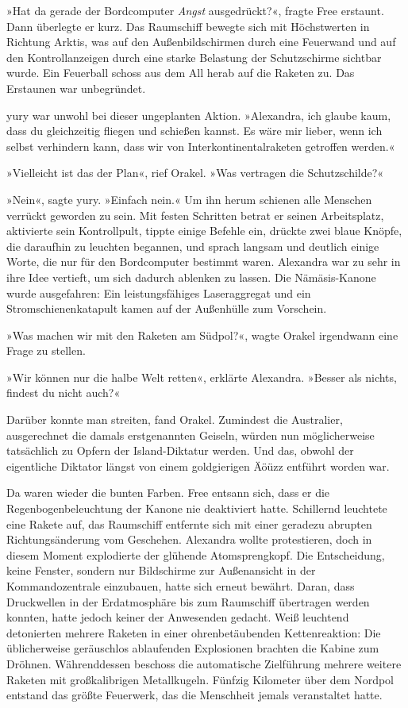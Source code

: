 »Hat da gerade der Bordcomputer \emph{Angst} ausgedrückt?«, fragte Free erstaunt. Dann überlegte er kurz. Das Raumschiff bewegte sich mit Höchstwerten in Richtung Arktis, was auf den Außenbildschirmen durch eine Feuerwand und auf den Kontrollanzeigen durch eine starke Belastung der Schutzschirme sichtbar wurde. Ein Feuerball schoss aus dem All herab auf die Raketen zu. Das Erstaunen war unbegründet.

yury war unwohl bei dieser ungeplanten Aktion. »Alexandra, ich glaube kaum, dass du gleichzeitig fliegen und schießen kannst. Es wäre mir lieber, wenn ich selbst verhindern kann, dass wir von Interkontinentalraketen getroffen werden.«

»Vielleicht ist das der Plan«, rief Orakel. »Was vertragen die Schutzschilde?«

»Nein«, sagte yury. »Einfach nein.« Um ihn herum schienen alle Menschen verrückt geworden zu sein. Mit festen Schritten betrat er seinen Arbeitsplatz, aktivierte sein Kontrollpult, tippte einige Befehle ein, drückte zwei blaue Knöpfe, die daraufhin zu leuchten begannen, und sprach langsam und deutlich einige Worte, die nur für den Bordcomputer bestimmt waren. Alexandra war zu sehr in ihre Idee vertieft, um sich dadurch ablenken zu lassen. Die Nämäsis-Kanone wurde ausgefahren: Ein leistungsfähiges Laseraggregat und ein Stromschienenkatapult kamen auf der Außenhülle zum Vorschein.

»Was machen wir mit den Raketen am Südpol?«, wagte Orakel irgendwann eine Frage zu stellen.

»Wir können nur die halbe Welt retten«, erklärte Alexandra. »Besser als nichts, findest du nicht auch?«

Darüber konnte man streiten, fand Orakel. Zumindest die Australier, ausgerechnet die damals erstgenannten Geiseln, würden nun möglicherweise tatsächlich zu Opfern der Island-Diktatur werden. Und das, obwohl der eigentliche Diktator längst von einem goldgierigen Äöüzz entführt worden war.

Da waren wieder die bunten Farben. Free entsann sich, dass er die Regenbogenbeleuchtung der Kanone nie deaktiviert hatte. Schillernd leuchtete eine Rakete auf, das Raumschiff entfernte sich mit einer geradezu abrupten Richtungsänderung vom Geschehen. Alexandra wollte protestieren, doch in diesem Moment explodierte der glühende Atomsprengkopf. Die Entscheidung, keine Fenster, sondern nur Bildschirme zur Außenansicht in der Kommandozentrale einzubauen, hatte sich erneut bewährt. Daran, dass Druckwellen in der Erdatmosphäre bis zum Raumschiff übertragen werden konnten, hatte jedoch keiner der Anwesenden gedacht. Weiß leuchtend detonierten mehrere Raketen in einer ohrenbetäubenden Kettenreaktion: Die üblicherweise geräuschlos ablaufenden Explosionen brachten die Kabine zum Dröhnen. Währenddessen beschoss die automatische Zielführung mehrere weitere Raketen mit großkalibrigen Metallkugeln. Fünfzig Kilometer über dem Nordpol entstand das größte Feuerwerk, das die Menschheit jemals veranstaltet hatte.

